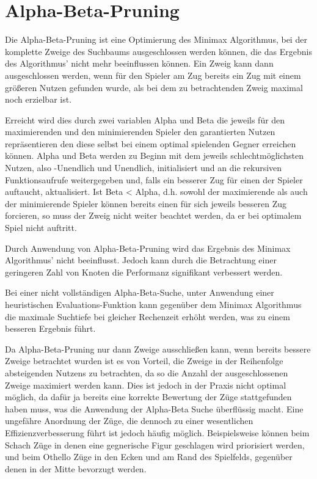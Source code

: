 \section{Alpha-Beta-Pruning}

Die Alpha-Beta-Pruning ist eine Optimierung des Minimax Algorithmus, bei der komplette Zweige des Suchbaums ausgeschlossen werden können, die das Ergebnis des Algorithmus' nicht mehr beeinflussen können.
Ein Zweig kann dann ausgeschlossen werden, wenn für den Spieler am Zug bereits ein Zug mit einem größeren Nutzen gefunden wurde, als bei dem zu betrachtenden Zweig maximal noch erzielbar ist.

Erreicht wird dies durch zwei variablen Alpha und Beta die jeweils für den maximierenden und den minimierenden Spieler den garantierten Nutzen repräsentieren den diese selbst bei einem optimal spielenden Gegner
erreichen können. Alpha und Beta werden zu Beginn mit dem jeweils schlechtmöglichsten Nutzen, also -Unendlich und Unendlich, initialisiert und an die rekursiven Funktionsaufrufe weitergegeben und, falls ein besserer Zug
für einen der Spieler auftaucht, aktualisiert.
Ist Beta < Alpha, d.h. sowohl der maximierende als auch der minimierende Spieler können bereits einen für sich jeweils besseren Zug forcieren, so muss der Zweig nicht weiter beachtet werden, da er bei optimalem Spiel nicht auftritt.

Durch Anwendung von Alpha-Beta-Pruning wird das Ergebnis des Minimax Algorithmus' nicht beeinflusst. Jedoch kann durch die Betrachtung einer geringeren Zahl von Knoten die Performanz signifikant verbessert werden.

Bei einer nicht vollständigen Alpha-Beta-Suche, unter Anwendung einer heuristischen Evaluations-Funktion kann gegenüber dem Minimax Algorithmus die maximale Suchtiefe bei gleicher Rechenzeit erhöht werden, was zu einem besseren Ergebnis führt.

Da Alpha-Beta-Pruning nur dann Zweige ausschließen kann, wenn bereits bessere Zweige betrachtet wurden ist es von Vorteil, die Zweige in der Reihenfolge absteigenden Nutzens zu betrachten, da so die Anzahl der ausgeschlossenen
Zweige maximiert werden kann.
Dies ist jedoch in der Praxis nicht optimal möglich, da dafür ja bereits eine korrekte Bewertung der Züge stattgefunden haben muss, was die Anwendung der Alpha-Beta Suche überflüssig macht.
Eine ungefähre Anordnung der Züge, die dennoch zu einer wesentlichen Effizienzverbesserung führt ist jedoch häufig möglich. Beispielsweise können beim Schach Züge in denen eine gegnerische Figur
geschlagen wird priorisiert werden, und beim Othello Züge in den Ecken und am Rand des Spielfelds, gegenüber denen in der Mitte bevorzugt werden.